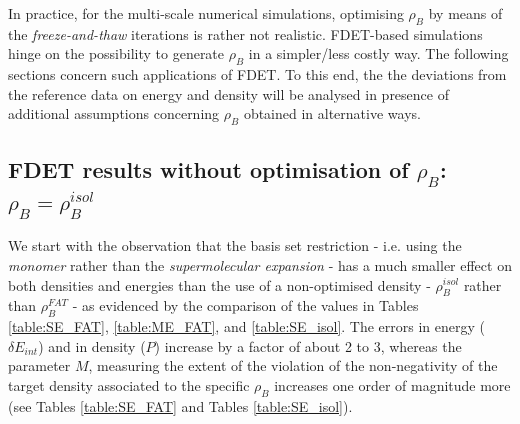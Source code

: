 \documentclass[amsmath,amssymb,preprint,aip,jcp]{revtex4-1}
\begin{document}
In practice, for the multi-scale numerical simulations, optimising 
$\rho_B$ by means of the {\it freeze-and-thaw} iterations is rather not realistic. FDET-based simulations hinge on the possibility to generate $\rho_B$ 
in a simpler/less costly way. 
The following sections concern such applications of FDET. 
To this end, the the deviations from the reference data on energy and density will be analysed in presence of additional assumptions concerning $\rho_B$ obtained in alternative ways. 
\subsection{FDET results without optimisation of $\rho_B$: $\rho_B=\rho_B^{isol}$}
We start with the observation that the basis set restriction - i.e. using the {\it monomer} rather than the {\it supermolecular expansion} - has a much smaller effect on both densities and energies than the use of a non-optimised density - $\rho_B^{isol}$ rather than $\rho_B^{FAT}$ - as evidenced by the comparison of the values in Tables \ref{table:SE_FAT}, \ref{table:ME_FAT}, and \ref{table:SE_isol}.
The errors in energy ($\delta E_{int}$) and in density ($P$) increase by a factor of about 2 to 3, whereas the parameter $M$, measuring the extent of the violation of the non-negativity of the target density associated to the specific $\rho_B$ increases one order of magnitude more (see Tables \ref{table:SE_FAT} and Tables \ref{table:SE_isol}). 
\end{document}
